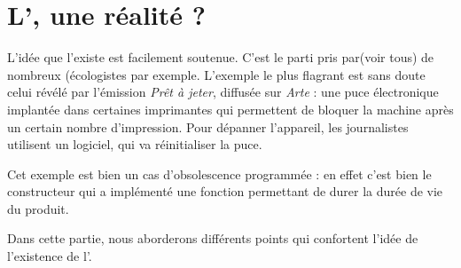 \section{L'\op, une réalité ?}

L'idée que l'\op existe est facilement soutenue. C'est le parti pris par(voir tous) de nombreux (écologistes par exemple. 
\smallbreak
L'exemple le plus flagrant est sans doute celui révélé par l'émission  \textit{Prêt à jeter}, diffusée sur \textit{Arte} : une puce électronique implantée dans certaines imprimantes qui permettent de bloquer la machine après un certain nombre d'impression. Pour dépanner l'appareil, les journalistes utilisent un logiciel, qui va réinitialiser la puce. 

Cet exemple est bien un cas d'obsolescence programmée : en effet c'est bien le constructeur qui a implémenté une fonction permettant de durer la durée de vie du produit. 

Dans cette partie, nous aborderons différents points qui confortent l'idée de l’existence de l'\op. 